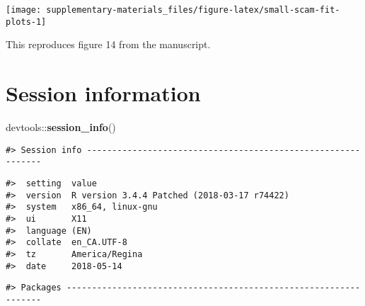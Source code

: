 \documentclass[12pt,]{article}
\newenvironment{Shaded}{\begin{snugshade}}{\end{snugshade}}
\newcommand{\KeywordTok}[1]{\textcolor[rgb]{0.13,0.29,0.53}{\textbf{{#1}}}}
\newcommand{\NormalTok}[1]{{#1}}
\begin{document}
\begin{center}\texttt{[image: supplementary-materials\_files/figure-latex/small-scam-fit-plots-1]} \end{center}

This reproduces figure 14 from the manuscript.

\section{Session information}\label{session-information}

\begin{Shaded}
\begin{Highlighting}[]
\NormalTok{devtools::}\KeywordTok{session_info}\NormalTok{()}
\end{Highlighting}
\end{Shaded}

\begin{verbatim}
#> Session info -------------------------------------------------------------
\end{verbatim}

\begin{verbatim}
#>  setting  value                                      
#>  version  R version 3.4.4 Patched (2018-03-17 r74422)
#>  system   x86_64, linux-gnu                          
#>  ui       X11                                        
#>  language (EN)                                       
#>  collate  en_CA.UTF-8                                
#>  tz       America/Regina                             
#>  date     2018-05-14
\end{verbatim}

\begin{verbatim}
#> Packages -----------------------------------------------------------------
\end{verbatim}
\end{document}
